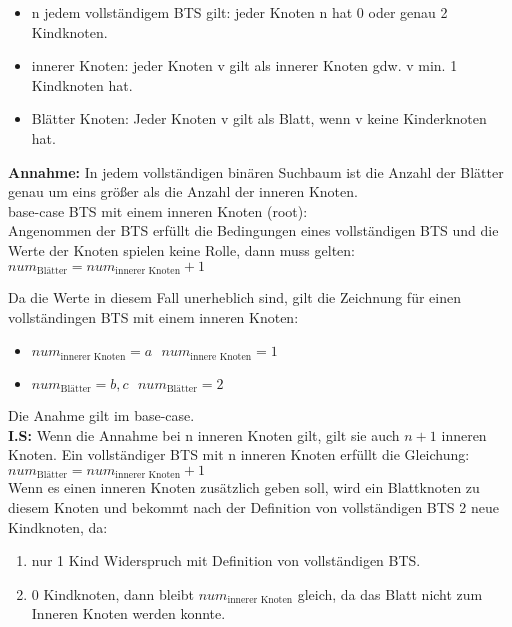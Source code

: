 \begin{answer}
\begin{itemize}
	\item n jedem vollständigem BTS gilt: jeder Knoten n hat 0 oder genau 2 Kindknoten. 
    \item innerer Knoten: jeder Knoten v gilt als innerer Knoten gdw. v min. 1 Kindknoten hat.
    \item Blätter Knoten: Jeder Knoten v gilt als Blatt, wenn v keine Kinderknoten hat.
\end{itemize}

\textbf{Annahme:} In jedem vollständigen binären Suchbaum ist die Anzahl der Blätter genau um eins größer als die Anzahl der inneren Knoten. \\

base-case BTS mit einem inneren Knoten (root): \\
Angenommen der BTS erfüllt die Bedingungen eines vollständigen BTS und die Werte der Knoten spielen keine Rolle, dann muss gelten:  \\
$num_{\text{Blätter}}=num_{\text{innerer Knoten}}+1$



Da die Werte in diesem Fall unerheblich sind, gilt die Zeichnung für einen vollständingen BTS mit einem inneren Knoten: \\
\begin{itemize}
	\item $num_{\text{innerer Knoten}}=a \text{ } num_{\text{innere Knoten}}=1$ 
	\item $num_{\text{Blätter}}=b,c \text{ } num_{\text{Blätter}}=2$ 
\end{itemize}

Die Anahme gilt im base-case. \\

\textbf{I.S:} Wenn die Annahme bei n inneren Knoten gilt, gilt sie auch $n+1$ inneren Knoten. 
Ein vollständiger BTS mit n inneren Knoten erfüllt die Gleichung:  \\
$num_{\text{Blätter}} = num_{\text{innerer Knoten}} + 1$ \\
Wenn es einen inneren Knoten zusätzlich geben soll, wird ein Blattknoten zu diesem Knoten und bekommt nach der Definition von vollständigen BTS 2 neue Kindknoten, da:

\begin{enumerate}
	\item nur 1 Kind Widerspruch mit Definition von vollständigen BTS.
	\item 0 Kindknoten, dann bleibt $num_{\text{innerer Knoten}}$ gleich, da das Blatt nicht zum Inneren Knoten werden konnte.
\end{enumerate}

\end{answer}

